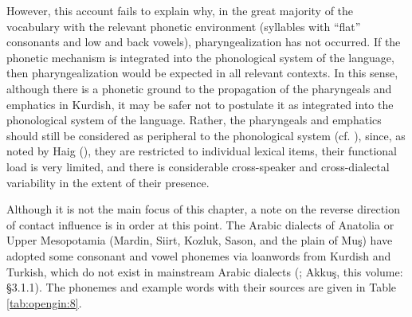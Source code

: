 \documentclass[output=paper]{langsci/langscibook}
\begin{document}
However, this account fails to explain why, in the great majority of the vocabulary with the relevant phonetic environment (syllables with “flat” consonants and low and back vowels), pharyngealization has not occurred. If the phonetic mechanism is integrated into the phonological system of the language, then pharyngealization would be expected in all relevant contexts. In this sense, although there is a phonetic ground to the propagation of the pharyngeals and emphatics in Kurdish, it may be safer not to postulate it as integrated into the phonological system of the language. Rather, the pharyngeals and emphatics should still be considered as peripheral to the phonological system (cf. \citealt{Haig2007,Anonbyforthcoming}), since, as noted by Haig (\citeyear[167]{Haig2007}), they are restricted to individual lexical items, their functional load is very limited, and there is considerable cross-speaker and cross-dialectal variability in the extent of their presence. 

Although it is not the main focus of this chapter, a note on the reverse direction of contact influence is in order at this point. The Arabic dialects of Anatolia or Upper Mesopotamia (Mardin, Siirt, Kozluk, Sason, and the plain of Muş) have adopted some consonant and vowel phonemes via loanwords from Kurdish and Turkish, which do not exist in mainstream Arabic dialects (\citealt[84]{Jastrow2011Kurdish}; Akkuş, this volume: §3.1.1). The phonemes and example words with their sources are given in Table \ref{tab:opengin:8}.
\end{document}

